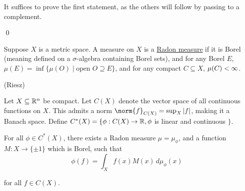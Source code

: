 \documentclass[x11names,reqno,14pt]{extarticle}
\begin{document}
\proof

It suffices to prove the first statement, as the others will follow by passing to a complement. 

\qed


Suppose $X$ is a metric space. A measure on $X$ is a \underline{Radon measure} if it is Borel (meaning defined on a $\sigma$-algebra containing Borel sets), and for any Borel $E$, $\mu(E) = \inf\{\mu(O) \mid \text{open }O \supseteq E\}$, and for any compact $C\subseteq X$, $\mu(C)<\infty$. 

\thm (Riesz)

Let $X \subseteq \mathbb{R}^n$ be compact. Let $C(X)$ denote the vector space of all continuous functions on $X$. This admits a norm $\norm{f}_{C(X)} = \sup_X|f|$, making it a Banach space. Define $C^*(X) = \{\phi:C(X)\to\mathbb{R}, \phi$ is linear and continuous $\}$. 

For all $\phi \in C^*(X)$, there exists a Radon measure $\mu = \mu_{\phi}$, and a function $M:X\to\{\pm1\}$ which is Borel, such that
\[
\phi(f) = \int_Xf(x)M(x)\,d\mu_{\phi}(x)
\]

for all $f \in C(X)$. 
\end{document}
